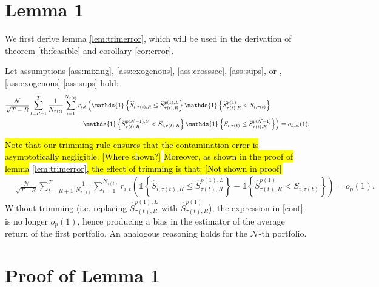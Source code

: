 \section{Lemma 1}

We first derive lemma \ref{lem:trimerror}, which will be used in the derivation of theorem \ref{th:feasible} and corollary \ref{cor:error}.

\begin{lemma}
\label{lem:trimerror} 
Let assumptions \ref{ass:mixing}, \ref{ass:exogenous}, \ref{ass:crosssec}, \ref{ass:sups}, or , \ref{ass:exogenous}-\ref{ass:sups} hold:
\begin{align*}
&\frac{\mathcal{N}}{\sqrt{T-R}}\sum_{t=R+1}^{T}\frac{1}{N_{\tau(t)}}\sum_{i=1}^{N_{\tau(t) }} r_{i,t}\left( \mathds{1} \left\{ \widehat{S}_{i,\tau(t),R}\leq \widehat{S}_{\tau(t),R}^{p(1),L}\right\} \mathds{1} \left\{ \widehat{S}_{\tau(t),R}^{p(1)} < S_{i,\tau(t) } \right\} \right. \\
&\hspace{3.9cm} \left. - \mathds{1} \left\{ \widehat{S}_{\tau(t),R}^{p(\mathcal{N}-1),U} < \widehat{S}_{i,\tau(t),R} \right\} \mathds{1} \left\{ S_{i,\tau(t) } \leq \widehat{S}_{\tau(t),R}^{p(\mathcal{N}-1)}\right\} \right) = o_{a.s.}(1).
\end{align*}
\end{lemma}
\hl{Note that our trimming rule ensures that the contamination error is asymptotically negligible. [Where shown?]} \hl{Moreover, as shown in the proof of lemma} \ref{lem:trimerror}\hl{, the effect of trimming is that: [Not shown in proof]}
\begin{align}
	\label{cont}
	&\frac{\mathcal{N}}{\sqrt{T-R}}\sum_{t=R+1}^{T}\frac{1}{N_{\tau(t)}}\sum_{i=1}^{N_{\tau(t) }} r_{i,t}\left( \mathds{1} \left\{ \widehat{S}_{i,\tau(t),R} \leq \widehat{S}_{\tau(t),R}^{p(1),L}\right\} - \mathds{1} \left\{ \widehat{S}_{\tau(t),R}^{p(1)} < S_{i,\tau(t)}\right\} \right) = o_{p}(1).
\end{align}
Without trimming (i.e. replacing $\widehat{S}_{\tau(t),R}^{p(1),L}$ with $\widehat{S}_{\tau(t),R}^{p(1)}$), the expression in \ref{cont} is no longer $o_p(1)$, hence producing a bias in the estimator of the average return of the first portfolio. An analogous reasoning holds for the $\mathcal{N}$-th portfolio.


\section{Proof of Lemma 1}
\label{Proof of lem:trimerror}

